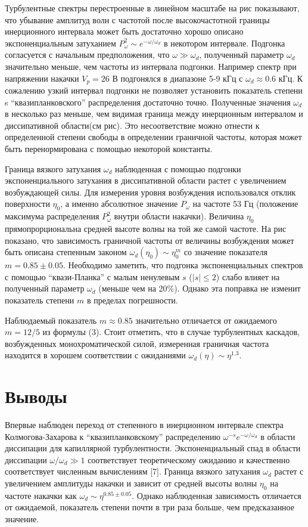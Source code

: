 	Турбулентные спектры перестроенные в линейном масштабе на рис показывают, что убывание амплитуд волн с частотой после высокочастотной границы инерционного интервала может быть достаточно хорошо описано экспоненциальным затуханием $P_\omega^2 \sim	e^{-\omega/\omega_d}$ в некотором интервале. Подгонка согласуется с начальным предположения, что $\omega \gg \omega_d$, полученный параметр $\omega_d$ значительно меньше, чем частоты из интервала подгонки. Например спектр при напряжении накачки $V_p = 26$ В подгонялся в диапазоне 5-9 кГц с $\omega_d \approx 0.6$ кГц. К сожалению узкий интервал подгонки не позволяет установить показатель степени s “квазипланковского” распределения достаточно точно. Полученные значения $\omega_d$ в несколько раз меньше, чем видимая граница между инерционным интервалом и диссипативной области(см рис). Это несоответствие можно отнести к определенной степени свободы в определении граничной частоты, которая может быть перенормирована с помощью некоторой константы.

	Граница вязкого затухания $\omega_d$ наблюденная с помощью подгонки экспоненциального затухания в диссипативной области растет с увеличением возбуждающей силы. Для измерения уровня возбуждения использовался отклик поверхности $\eta_0$, а именно абсолютное значение $P_\omega$ на частоте 53 Гц (положение максимума распределения $P_\omega^2$ внутри области накачки). Величина $\eta_0$ прямопрорциональна средней высоте волны на той же самой частоте. На рис показано, что зависимость граничной частоты от величины возбуждения может быть описана степенным законом $\omega_d(\eta_0) \sim	\eta_0^m$ со значение показателя $m = 0.85 \pm 0.05$. Необходимо заметить, что подгонка экспоненциальных спектров с помощью “квази-Планка” с малым ненулевым $s$ ($|s| \le 2$) слабо влияет на полученный параметр $\omega_d$ (меньше чем на 20\%). Однако эта поправка не изменит показатель степени $m$ в пределах погрешности.

	Наблюдаемый показатель $m \approx 0.85$ значительно отличается от ожидаемого $m = 12/5$ из формулы (3). Стоит отметить, что в случае турбулентных каскадов, возбужденных монохроматической силой, измеренная граничная частота находится в хорошем соответствии с ожиданиями $\omega_d(\eta) \sim \eta^{1.3}$.

\section{Выводы} %
 	Впервые наблюден переход от степенного в инерционном интервале спектра Колмогова-Захарова к “квазипланковскому” распределению $\omega^{-s}e^{-\omega/\omega_d}$ в области диссипации для капиллярной турбулентности. Экспоненциальный спад в области диссипации $\omega/\omega_d \gg 1$ соответствует теоретическому ожиданию и качественно соответствует численным вычислениям [7]. Граница вязкого затухания $\omega_d$ растет с увеличением амплитуды накачки и зависит от средней высоты волны $\eta_0$ на частоте накачки как $\omega_d \sim \eta^{0.85 \pm 0.05}$. Однако наблюденная зависимость отличается от ожидаемой, показатель степени почти в три раза больше, чем предсказанное значение.


\clearpage